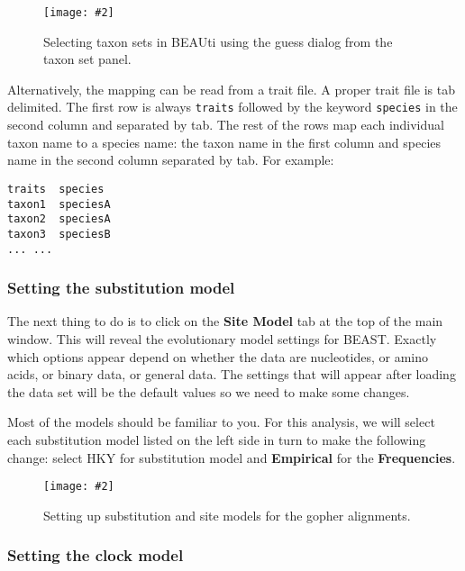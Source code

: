 \documentclass{article}
\newcommand{\includeimage}[2][]{%
\texttt{[image: \#2]}
}
\begin{document}
\begin{figure}
\centering
\includeimage[width=\textwidth]{figures/BEAUti_Guess_Taxonsets}

\caption{\label{fig.taxonset} Selecting taxon sets in BEAUti using the guess dialog from the taxon set panel.}
\end{figure}


Alternatively, the mapping can be read from a trait file.
A proper trait file is tab delimited. The first row is always \texttt{traits} followed by the keyword \texttt{species} in the second column and separated by tab. The rest of the rows map each individual taxon name to a species name: the taxon name in the first column and species name in the second column separated by tab. For example:

\begin{verbatim}
traits	species
taxon1	speciesA
taxon2	speciesA
taxon3	speciesB
... ...
\end{verbatim}



\subsubsection*{Setting the substitution model}

The next thing to do is to click on the {\bf Site Model} tab at the top of the
main window. This will reveal the evolutionary model settings for
BEAST. Exactly which options appear depend on whether the data are
nucleotides, or amino acids, or binary data, or general data.
The settings that will appear after loading the data set will
be the default values so we need to make some changes. 

Most of the models should be familiar to you. For this analysis, we
will select each substitution model listed on the 
left side in turn to make the following change: select HKY for substitution model
and \textbf{Empirical} for the \textbf{Frequencies}. 
\begin{figure}
\centering
\includeimage[width=\textwidth]{figures/BEAUti_Site_Model}

\caption{\label{fig.sitemodel} Setting up substitution and site models for the gopher alignments.}
\end{figure}


\subsubsection*{Setting the clock model}
\end{document}
